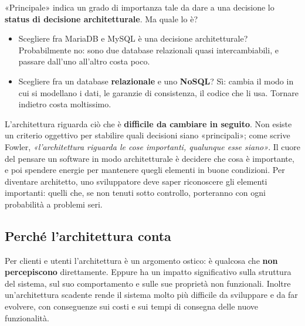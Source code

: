 «Principale» indica un grado di importanza tale da dare a una decisione lo \textbf{status di decisione architetturale}.
Ma quale lo è?
\begin{itemize}
  \item Scegliere fra MariaDB e MySQL è una decisione architetturale? Probabilmente no: sono due database relazionali quasi
        intercambiabili, e passare dall'uno all'altro costa poco.
  \item Scegliere fra un database \textbf{relazionale} e uno \textbf{NoSQL}? Sì: cambia il modo in cui si modellano i dati,
        le garanzie di consistenza, il codice che li usa. Tornare indietro costa moltissimo.
\end{itemize}

L'architettura riguarda ciò che è \textbf{difficile da cambiare in seguito}. Non esiste un criterio oggettivo per stabilire
quali decisioni siano «principali»; come scrive Fowler, \textit{«l'architettura riguarda le cose importanti, qualunque esse
siano»}. Il cuore del pensare un software in modo architetturale è decidere che cosa è importante, e poi spendere energie
per mantenere quegli elementi in buone condizioni. Per diventare architetto, uno sviluppatore deve saper riconoscere gli
elementi importanti: quelli che, se non tenuti sotto controllo, porteranno con ogni probabilità a problemi seri.

\subsection{Perché l'architettura conta}

Per clienti e utenti l'architettura è un argomento ostico: è qualcosa che \textbf{non percepiscono} direttamente. Eppure ha
un impatto significativo sulla struttura del sistema, sul suo comportamento e sulle sue proprietà non funzionali. Inoltre
un'architettura scadente rende il sistema molto più difficile da sviluppare e da far evolvere, con conseguenze sui costi e
sui tempi di consegna delle nuove funzionalità.

